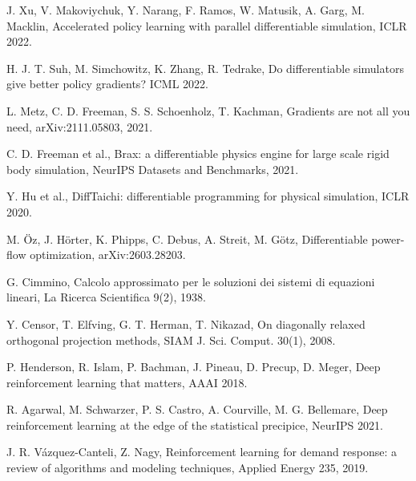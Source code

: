 \documentclass[11pt]{article}
\begin{document}
\begin{list}{}{\setlength{\leftmargin}{2.4em}\setlength{\labelwidth}{2.4em}\setlength{\itemsep}{2pt}\setlength{\parsep}{0pt}}
\item[\textbf{[27]}] J. Xu, V. Makoviychuk, Y. Narang, F. Ramos, W. Matusik, A. Garg, M. Macklin, Accelerated policy learning with parallel differentiable simulation, ICLR 2022.
\item[\textbf{[28]}] H. J. T. Suh, M. Simchowitz, K. Zhang, R. Tedrake, Do differentiable simulators give better policy gradients? ICML 2022.
\item[\textbf{[29]}] L. Metz, C. D. Freeman, S. S. Schoenholz, T. Kachman, Gradients are not all you need, arXiv:2111.05803, 2021.
\item[\textbf{[30]}] C. D. Freeman et al., Brax: a differentiable physics engine for large scale rigid body simulation, NeurIPS Datasets and Benchmarks, 2021.
\item[\textbf{[31]}] Y. Hu et al., DiffTaichi: differentiable programming for physical simulation, ICLR 2020.
\item[\textbf{[32]}] M. \"Oz, J. H\"orter, K. Phipps, C. Debus, A. Streit, M. G\"otz, Differentiable power-flow optimization, arXiv:2603.28203.
\item[\textbf{[33]}] G. Cimmino, Calcolo approssimato per le soluzioni dei sistemi di equazioni lineari, La Ricerca Scientifica 9(2), 1938.
\item[\textbf{[34]}] Y. Censor, T. Elfving, G. T. Herman, T. Nikazad, On diagonally relaxed orthogonal projection methods, SIAM J. Sci. Comput. 30(1), 2008.
\item[\textbf{[35]}] P. Henderson, R. Islam, P. Bachman, J. Pineau, D. Precup, D. Meger, Deep reinforcement learning that matters, AAAI 2018.
\item[\textbf{[36]}] R. Agarwal, M. Schwarzer, P. S. Castro, A. Courville, M. G. Bellemare, Deep reinforcement learning at the edge of the statistical precipice, NeurIPS 2021.
\item[\textbf{[37]}] J. R. V\'azquez-Canteli, Z. Nagy, Reinforcement learning for demand response: a review of algorithms and modeling techniques, Applied Energy 235, 2019.
\end{list}
\end{document}

